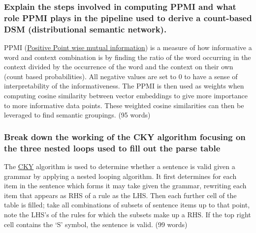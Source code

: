 \documentclass[
  11pt,
  british,
]{article}
\begin{document}
\hypertarget{explain-the-steps-involved-in-computing-ppmi-and-what-role-ppmi-plays-in-the-pipeline-used-to-derive-a-count-based-dsm-distributional-semantic-network.}{%
\subsubsection{Explain the steps involved in computing PPMI and what
role PPMI plays in the pipeline used to derive a count-based DSM
(distributional semantic
network).}\label{explain-the-steps-involved-in-computing-ppmi-and-what-role-ppmi-plays-in-the-pipeline-used-to-derive-a-count-based-dsm-distributional-semantic-network.}}

PPMI
(\href{../Semantic-Similarity/Point\%20wise\%20mutual\%20information\%20(PMI).md}{Positive
Point wise mutual information}) is a measure of how informative a word
and context combination is by finding the ratio of the word occurring in
the context divided by the occurrence of the word and the context on
their own (count based probabilities). All negative values are set to 0
to have a sense of interpretability of the informativeness. The PPMI is
then used as weights when computing cosine similarity between vector
embeddings to give more importance to more informative data points.
These weighted cosine similarities can then be leveraged to find
semantic groupings. (95 words)

\hypertarget{break-down-the-working-of-the-cky-algorithm-focusing-on-the-three-nested-loops-used-to-fill-out-the-parse-table}{%
\subsubsection{Break down the working of the CKY algorithm focusing on
the three nested loops used to fill out the parse
table}\label{break-down-the-working-of-the-cky-algorithm-focusing-on-the-three-nested-loops-used-to-fill-out-the-parse-table}}

The \href{../Languages/CKY.md}{CKY} algorithm is used to determine
whether a sentence is valid given a grammar by applying a nested looping
algorithm. It first determines for each item in the sentence which forms
it may take given the grammar, rewriting each item that appears as RHS
of a rule as the LHS. Then each further cell of the table is filled;
take all combinations of subsets of sentence items up to that point,
note the LHS's of the rules for which the subsets make up a RHS. If the
top right cell contains the `S' symbol, the sentence is valid. (99
words)
\end{document}
